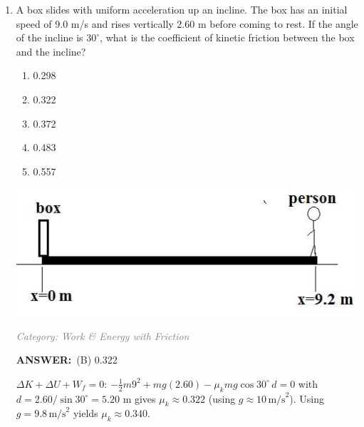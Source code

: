 \documentclass[12pt, a4paper]{article}
\makeatletter
\newcommand{\finalanswer}[1]{\textbf{ANSWER:}~#1}
\newif\if@categoryprinted
\newcommand{\category}[1]{\if@categoryprinted\relax\else\textit{\textcolor{gray}{Category: #1}}\global\@categoryprintedtrue\fi}
\makeatother
\begin{document}
\begin{CJK*}{UTF8}{gbsn}
\begin{enumerate}[itemsep=1.0em, topsep=0.6em]
\item \label{prob:28}
\noindent\begin{minipage}[t]{0.6\linewidth}
\vspace{0pt}
A box slides with uniform acceleration up an incline. The box has an initial speed of 9.0 m/s and rises vertically 2.60 m before coming to rest. If the angle of the incline is $30^\circ$, what is the coefficient of kinetic friction between the box and the incline?
\begin{enumerate}[label=(\Alph*)]
    \item 0.298
    \item 0.322
    \item 0.372
    \item 0.483
    \item 0.557
\end{enumerate}
\end{minipage}%
\hfill
\begin{minipage}[t]{0.35\linewidth}
\vspace{0pt}
\centering
\includegraphics[width=\linewidth]{Problem_29_Figure.png}
\end{minipage}

\category{Work \& Energy with Friction}
\begin{answerbox}
\finalanswer{(B) 0.322}
\end{answerbox}
\begin{solutionbox}

$\Delta K+\Delta U+W_f=0$: $-\tfrac{1}{2}m9^2 + mg(2.60) - \mu_k mg\cos30^\circ\,d=0$ with $d=2.60/\sin30^\circ=5.20$ m gives $\mu_k\approx0.322$ (using $g\approx10\,\text{m/s}^2$). Using $g=9.8\,\text{m/s}^2$ yields $\mu_k\approx0.340$.
\end{solutionbox}

\newpage


\end{enumerate}
\end{CJK*}
\end{document}
